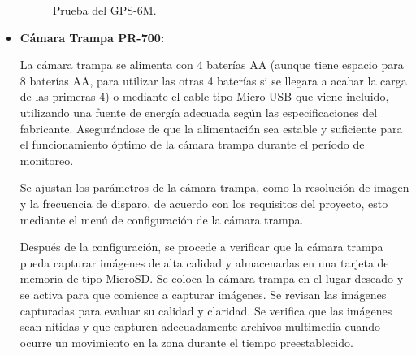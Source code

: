\begin{itemize}
\begin{figure}[H]
    \centering
    \quad
    \caption{Prueba del GPS-6M.}
    \label{fig:prueba_gps}
\end{figure}

\item \textbf{Cámara Trampa PR-700:}

La cámara trampa se alimenta con 4 baterías AA (aunque tiene espacio para 8 baterías AA, para utilizar las otras 4 baterías si se llegara a acabar la carga de las primeras 4) o mediante el cable tipo Micro USB que viene incluido, utilizando una fuente de energía adecuada según las especificaciones del fabricante. Asegurándose de que la alimentación sea estable y suficiente para el funcionamiento óptimo de la cámara trampa durante el período de monitoreo.

Se ajustan los parámetros de la cámara trampa, como la resolución de imagen y la frecuencia de disparo, de acuerdo con los requisitos del proyecto, esto mediante el menú de configuración de la cámara trampa.

Después de la configuración, se procede a verificar que la cámara trampa pueda capturar imágenes de alta calidad y almacenarlas en una tarjeta de memoria de tipo MicroSD. Se coloca la cámara trampa en el lugar deseado y se activa para que comience a capturar imágenes. Se revisan las imágenes capturadas para evaluar su calidad y claridad. Se verifica que las imágenes sean nítidas y que capturen adecuadamente archivos multimedia cuando ocurre un movimiento en la zona durante el tiempo preestablecido.


\end{itemize}
